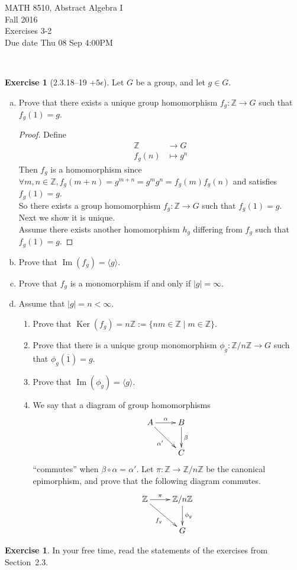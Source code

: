 \documentclass{amsart}
\newcommand{\bbz}{\mathbb{Z}}
\renewcommand{\ker}{\operatorname{Ker}}
\newcommand{\im}{\operatorname{Im}}
\theoremstyle{plain}
\theoremstyle{definition}
\newtheorem{exer}[lem]{Exercise}
\begin{document}
\noindent MATH 8510, Abstract Algebra I \\
Fall 2016\\
Exercises 3-2\\
Due date Thu 08 Sep 4:00PM

\

%
%

\begin{exer}[2.3.18--19 $+5\epsilon$]
Let $G$ be a group, and let $g\in G$.
\begin{enumerate}[(a)]
\item Prove that there exists a unique group homomorphism $f_g\colon\bbz\to G$ such that $f_g(1)=g$. 
	\begin{proof}
	Define
		\begin{align*}
			\bbz & \to G \\
			f_g(n) & \mapsto g^n
		\end{align*}
		Then $f_g$ is a homomorphism since $\forall m,n \in \bbz, f_g(m+n) = g^{m+n} = g^mg^n = f_g(m)f_g(n)$ and satisfies $f_g(1) = g$.\\
		So there exists a group homomorphism $f_g\colon\bbz\to G$ such that $f_g(1)=g$.\\
		Next we show it is unique.\\
		Assume there exists another homomorphism $h_g$ differing from $f_g$ such that $f_g(1) = g$. 
	\end{proof}
	
\item Prove that $\im(f_g)=\langle g\rangle$.
\item Prove that $f_g$ is a monomorphism if and only if $|g|=\infty$.
\item Assume that $|g|=n<\infty$.
\begin{enumerate}[(1)]
\item Prove that $\ker(f_g)=n\bbz:=\{nm\in\bbz\mid m\in\bbz\}$.
\item Prove that 
there is a unique group monomorphism $\phi_g\colon\bbz/n\bbz\to G$ such that $\phi_g(\overline 1)=g$. 
\item Prove that $\im(\phi_g)=\langle g\rangle$.
\item We say that a diagram 
of group homomorphisms
$$\xymatrix{A\ar[r]^-\alpha\ar[rd]_{\alpha'}&B\ar[d]^\beta \\ & C}$$
``commutes'' when $\beta\circ\alpha=\alpha'$.
Let $\pi\colon \bbz\to\bbz/n\bbz$ be the canonical epimorphism, and prove that the following diagram commutes.
$$\xymatrix{\bbz\ar[r]^-{\pi}\ar[rd]_{f_g}&\bbz/n\bbz\ar[d]^{\phi_g} \\ & G}$$
\end{enumerate}
\end{enumerate}
\end{exer}


\begin{exer}
In your free time, read the statements of the  exercises from Section~2.3.
\end{exer}
\end{document}
